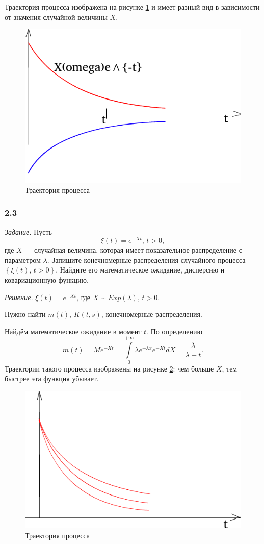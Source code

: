 Траектория процесса изображена на рисунке \ref{fig:22}
и имеет разный вид в зависимости от значения случайной величины $X$.

\begin{figure}[h!]
  \centering
  \includegraphics[width=.4\textwidth]{./pictures/2_2.png}
  \caption{Траектория процесса}
  \label{fig:22}
\end{figure}

\subsubsection*{2.3}

\textit{Задание.}
Пусть
$$ \xi \left( t \right) =
  e^{-Xt}, \,
  t > 0,$$
где $X$ --- случайная величина, которая имеет показательное распределение с параметром $ \lambda $.
Запишите конечномерные распределения случайного процесса
$ \left\{ \xi \left( t \right), \, t > 0 \right\} $.
Найдите его математическое ожидание, дисперсию и ковариационную функцию.

\textit{Решение.}
$ \xi \left( t \right) = e^{-Xt}$, где $X \sim Exp \left( \lambda \right), \, t > 0$.

Нужно найти $m \left( t \right), \, K \left( t, s \right) $, конечномерные распределения.

Найдём математическое ожидание в момент $t$.
По определению
$$m \left( t \right) =
  Me^{-Xt} =
  \int \limits_0^{+ \infty } \lambda e^{- \lambda x} e^{-Xt} dX =
  \frac{ \lambda }{ \lambda + t}.$$
Траектории такого процесса изображены на рисунке \ref{fig:23}: чем больше $X$,
тем быстрее эта функция убывает.

\begin{figure}[h!]
  \centering
  \includegraphics[width=.4\textwidth]{./pictures/2_3.png}
  \caption{Траектория процесса}
  \label{fig:23}
\end{figure}

